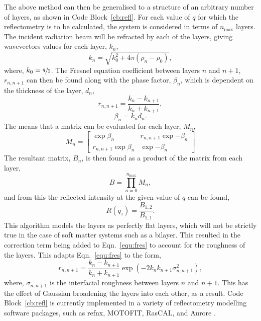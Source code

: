 The above method can then be generalised to a structure of an arbitrary number of layers, as shown in Code Block~\ref{cb:refl}.
For each value of $q$ for which the reflectometry is to be calculated, the system is considered in terms of $n_{\text{max}}$ layers.
The incident radiation beam will be refracted by each of the layers, giving wavevectors values for each layer, $k_n$,
%
\begin{equation}
	k_n = \sqrt{k_0^2 + 4\pi (\rho_n - \rho_0)},
\end{equation}
%
where, $k_0=\sfrac{q}{2}$.
The Fresnel equation coefficient between layers $n$ and $n+1$, $r_{n,n+1}$ can then be found along with the phase factor, $\beta_n$, which is dependent on the thickness of the layer, $d_n$,
%
\begin{equation}
	r_{n,n+1} = \frac{k_n - k_{n+1}}{k_n + k_{n+1}},
	\label{equ:fres}
\end{equation}
%
%
\begin{equation}
	\beta_n = k_n d_n.
\end{equation}
%
The means that a matrix can be evaluated for each layer, $M_n$,
%
\begin{equation}
	M_n =
	\begin{bmatrix}
		\exp{\beta_n} & r_{n,n+1}\exp{-\beta_n} \\ r_{n,n+1}\exp{\beta_n} & \exp{-\beta_n}
	\end{bmatrix}
\end{equation}
%
The resultant matrix, $B_n$, is then found as a product of the matrix from each layer,
%
\begin{equation}
	B = \prod_{n=0}^{n_{\text{max}}} M_n,
\end{equation}
%
and from this the reflected intensity at the given value of $q$ can be found,
%
\begin{equation}
	R(q_z) = \frac{B_{1,2}}{B_{1,1}}.
\end{equation}
%
This algorithm models the layers as perfectly flat layers, which will not be strictly true in the case of soft matter systems such as a bilayer.
This resulted in the correction term being added to Eqn.~\ref{equ:fres} to account for the roughness of the layers.
This adapts Eqn.~\ref{equ:fres} to the form,
%
\begin{equation}
	r_{n,n+1} = \frac{k_n - k_{n+1}}{k_n + k_{n+1}}\exp{(-2k_nk_{n+1}\sigma^2_{n,n+1})},
\end{equation}
%
where, $\sigma_{n,n+1}$ is the interfacial roughness between layers $n$ and $n+1$.
This has the effect of Gaussian broadening the layers into each other, as a result. Code Block~\ref{cb:refl} is currently implemented in a variety of reflectometry modelling software packages, such as refnx, MOTOFIT, RasCAL, and Aurore \cite{refnx2018,Nelson2006,rascal2016,Gerelli2016,Gerelli2016a}.

